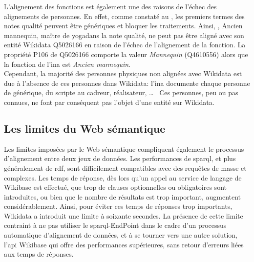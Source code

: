 L'alignement des fonctions est également une des raisons de l'échec des alignements de personnes. En effet, comme constaté au , les premiers termes des notes qualité peuvent être génériques et bloquer les traitements. Ainsi, , \og Ancien mannequin, maître de yoga\fg dans la note qualité, ne peut pas être aligné avec son entité Wikidata Q5026166 en raison de l'échec de l'alignement de la fonction. La propriété P106 de Q5026166 comporte la valeur \textit{Mannequin} (Q4610556) alors que la fonction de l'\ac{ina} est \textit{Ancien mannequin}.\\

Cependant, la majorité des personnes physiques non alignées avec Wikidata est due à l'absence de ces personnes dans Wikidata: l'\ac{ina} documente chaque personne de générique, du scripte au cadreur, réalisateur, \dots~ Ces personnes, peu ou pas connues, ne font par conséquent pas l'objet d'une entité sur Wikidata.

\subsection{\label{II-C-4-b}Les limites du Web sémantique}

Les limites imposées par le Web sémantique compliquent également le processus d'alignement entre deux jeux de données. Les performances de \ac{sparql}, et plus généralement de \ac{rdf}, sont difficilement compatibles avec des requêtes de masse et complexes. Les temps de réponse, dès lors qu'un appel au service de langage de Wikibase est effectué, que trop de clauses optionnelles ou obligatoires sont introduites, ou bien que le nombre de résultats est trop important, augmentent considérablement. Ainsi, pour éviter ces temps de réponses trop importants, Wikidata a introduit une limite à soixante secondes. La présence de cette limite contraint à ne pas utiliser le \ac{sparql}-EndPoint dans le cadre d'un processus automatique d'alignement de données, et à se tourner vers une autre solution, l'\ac{api} Wikibase qui offre des performances supérieures, sans retour d'erreurs liées aux temps de réponses.\\

